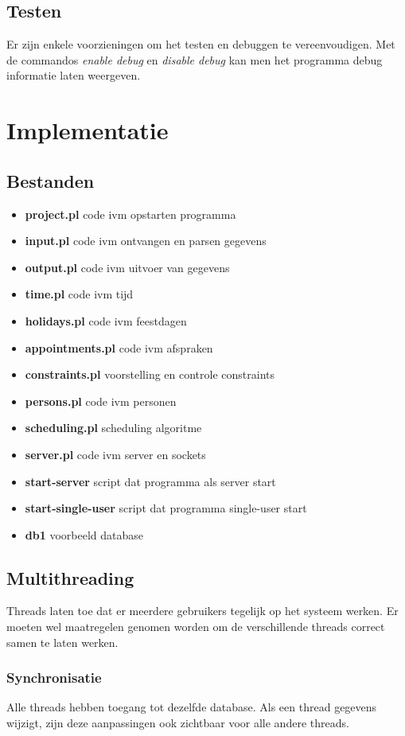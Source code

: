 \documentclass[a4paper]{article}
\begin{document}
\subsection{Testen}
Er zijn enkele voorzieningen om het testen en debuggen te vereenvoudigen.
Met de commandos {\em enable debug} en {\em disable debug} kan men het programma debug informatie laten weergeven.

\section{Implementatie}

\subsection{Bestanden}

\begin{itemize}
\item{\bf project.pl} code ivm opstarten programma
\item{\bf input.pl} code ivm ontvangen en parsen gegevens
\item{\bf output.pl} code ivm uitvoer van gegevens
\item{\bf time.pl} code ivm tijd
\item{\bf holidays.pl} code ivm feestdagen
\item{\bf appointments.pl} code ivm afspraken
\item{\bf constraints.pl} voorstelling en controle constraints
\item{\bf persons.pl} code ivm personen
\item{\bf scheduling.pl} scheduling algoritme
\item{\bf server.pl} code ivm server en sockets
\item{\bf start-server} script dat programma als server start
\item{\bf start-single-user} script dat programma single-user start
\item{\bf db1} voorbeeld database
\end{itemize}

\subsection{Multithreading}
Threads laten toe dat er meerdere gebruikers tegelijk op het systeem werken.
Er moeten wel maatregelen genomen worden om de verschillende threads correct samen te laten werken.

\subsubsection{Synchronisatie}
Alle threads hebben toegang tot dezelfde database.
Als een thread gegevens wijzigt, zijn deze aanpassingen ook zichtbaar voor alle andere threads.
\end{document}
